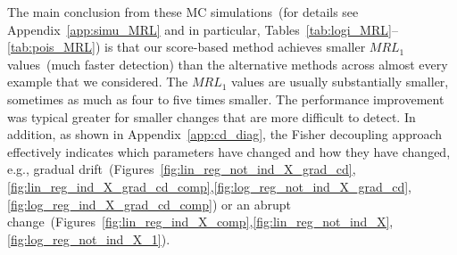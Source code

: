 \documentclass[twoside,11pt]{article}
\begin{document}
The main conclusion from these MC simulations~(for details see Appendix~\ref{app:simu_MRL} and in particular, Tables~\ref{tab:logi_MRL}--\ref{tab:pois_MRL}) is that our score-based method achieves smaller $MRL_1$ values~(much faster detection) than the alternative methods across almost every example that we considered. The $MRL_1$ values are usually substantially smaller, sometimes as much as four to five times smaller. The performance improvement was typical greater for smaller changes that are more difficult to detect. In addition, as shown in Appendix~\ref{app:cd_diag}, the Fisher decoupling approach effectively indicates which parameters have changed and how they have changed, e.g., gradual drift~(Figures~\ref{fig:lin_reg_not_ind_X_grad_cd},\ref{fig:lin_reg_ind_X_grad_cd_comp},\ref{fig:log_reg_not_ind_X_grad_cd},\ref{fig:log_reg_ind_X_grad_cd_comp}) or an abrupt change~(Figures~\ref{fig:lin_reg_ind_X_comp},\ref{fig:lin_reg_not_ind_X},\ref{fig:log_reg_not_ind_X_1}). %
\end{document}
